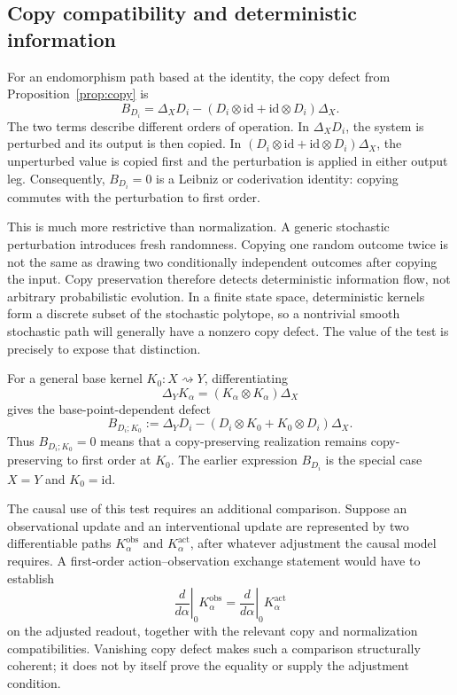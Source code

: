\documentclass{article}
\theoremstyle{plain}
\theoremstyle{definition}
\theoremstyle{remark}
\newcommand{\id}{\mathrm{id}}
\begin{document}
\subsection{Copy compatibility and deterministic information}

For an endomorphism path based at the identity, the copy defect from
Proposition~\ref{prop:copy} is
\[
  B_{D_i}
  =
  \Delta_XD_i
  -(D_i\otimes\id+\id\otimes D_i)\Delta_X .
\]
The two terms describe different orders of operation.  In
\(\Delta_XD_i\), the system is perturbed and its output is then copied.  In
\((D_i\otimes\id+\id\otimes D_i)\Delta_X\), the unperturbed value is copied
first and the perturbation is applied in either output leg.  Consequently,
\(B_{D_i}=0\) is a Leibniz or coderivation identity: copying commutes with the
perturbation to first order.

This is much more restrictive than normalization.  A generic stochastic
perturbation introduces fresh randomness.  Copying one random outcome twice is
not the same as drawing two conditionally independent outcomes after copying
the input.  Copy preservation therefore detects deterministic information
flow, not arbitrary probabilistic evolution.  In a finite state space,
deterministic kernels form a discrete subset of the stochastic polytope, so a
nontrivial smooth stochastic path will generally have a nonzero copy defect.
The value of the test is precisely to expose that distinction.

For a general base kernel \(K_0:X\rightsquigarrow Y\), differentiating
\[
  \Delta_YK_\alpha
  =
  (K_\alpha\otimes K_\alpha)\Delta_X
\]
gives the base-point-dependent defect
\[
  B_{D_i;K_0}
  :=
  \Delta_YD_i
  -(D_i\otimes K_0+K_0\otimes D_i)\Delta_X.
\]
Thus \(B_{D_i;K_0}=0\) means that a copy-preserving realization remains
copy-preserving to first order at \(K_0\).  The earlier expression \(B_{D_i}\)
is the special case \(X=Y\) and \(K_0=\id\).

The causal use of this test requires an additional comparison.  Suppose an
observational update and an interventional update are represented by two
differentiable paths \(K_\alpha^{\mathrm{obs}}\) and
\(K_\alpha^{\mathrm{act}}\), after whatever adjustment the causal model
requires.  A first-order action--observation exchange statement would have to
establish
\[
  \left.\frac{d}{d\alpha}\right|_0
  K_\alpha^{\mathrm{obs}}
  =
  \left.\frac{d}{d\alpha}\right|_0
  K_\alpha^{\mathrm{act}}
\]
on the adjusted readout, together with the relevant copy and normalization
compatibilities.  Vanishing copy defect makes such a comparison structurally
coherent; it does not by itself prove the equality or supply the adjustment
condition.
\end{document}

